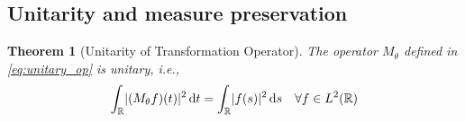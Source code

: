 \documentclass{article}
\newtheorem{theorem}{Theorem}
\begin{document}
\subsection{Unitarity and measure preservation}

\begin{theorem}[Unitarity of Transformation Operator]
  \label{thm:unitary}The operator $M_{\theta}$ defined in
  \eqref{eq:unitary_op} is unitary, i.e.,
  \begin{equation}
    \label{eq:L2_preserve} \int_{\mathbb{R}} \lvert (M_{\theta} f) (t)
    \rvert^2 \hspace{0.17em} \mathrm{d} t = \int_{\mathbb{R}} \lvert f (s)
    \rvert^2 \hspace{0.17em} \mathrm{d} s \quad \forall f \in L^2 (\mathbb{R})
  \end{equation}
\end{theorem}
\end{document}
